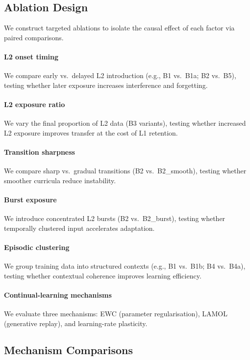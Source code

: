 \subsection{Ablation Design}

We construct targeted ablations to isolate the causal effect
of each factor via paired comparisons.

\paragraph{L2 onset timing}
We compare early vs.\ delayed L2 introduction
(e.g., B1 vs.\ B1a; B2 vs.\ B5), testing whether later exposure
increases interference and forgetting.

\paragraph{L2 exposure ratio}
We vary the final proportion of L2 data (B3 variants),
testing whether increased L2 exposure improves transfer
at the cost of L1 retention.

\paragraph{Transition sharpness}
We compare sharp vs.\ gradual transitions (B2 vs.\ B2\_smooth),
testing whether smoother curricula reduce instability.

\paragraph{Burst exposure}
We introduce concentrated L2 bursts (B2 vs.\ B2\_burst),
testing whether temporally clustered input accelerates adaptation.

\paragraph{Episodic clustering}
We group training data into structured contexts
(e.g., B1 vs.\ B1b; B4 vs.\ B4a),
testing whether contextual coherence improves learning efficiency.

\paragraph{Continual-learning mechanisms}
We evaluate three mechanisms:
EWC (parameter regularisation), LAMOL (generative replay),
and learning-rate plasticity.

\subsection{Mechanism Comparisons}

